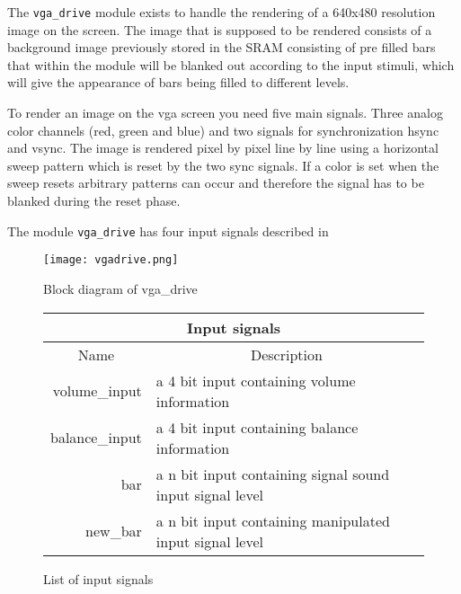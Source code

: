 The \verb+vga_drive+ module exists to handle the rendering of a 640x480 resolution image on the screen. 
The image that is supposed to be rendered consists of a background image previously 
stored in the SRAM consisting of pre filled bars that within the module will be blanked
out according to the input stimuli, which will give the appearance of bars being filled 
to different levels.   

To render an image on the vga screen you need five main signals. Three analog color channels (red, green and blue)
and two signals for synchronization hsync and vsync. The image is rendered pixel by pixel line by line using
a horizontal sweep pattern which is reset by the two sync signals. If a color is set when the sweep resets
arbitrary patterns can occur and therefore the signal has to be blanked during the reset phase.

The module \verb+vga_drive+ has four input signals described in 

\begin{figure}[h]
        \texttt{[image: vgadrive.png]}
        \caption{Block diagram of vga\_drive}
        \label{fig:vgadrive}
\end{figure}

\begin{figure}[h]
        \caption{List of input signals}
        \label{tab:input}
\begin{tabular}{|r|l|}
        \hline
        \multicolumn{2}{|c|}{Input signals}\\
        \hline
        \multicolumn{1}{|c}{Name} & \multicolumn{1}{c|}{Description} \\
        \hline
        volume\_input & a 4 bit input containing volume information\\
        \cline{1-2}
        \hline
        balance\_input & a 4 bit input containing balance information\\
        \cline{1-2}    
        \hline
        bar & a n bit input containing signal sound input signal level\\
        \cline{1-2}    
        \hline
        new\_bar & a n bit input containing manipulated input signal level\\
        \cline{1-2}    
        \hline
\end{tabular}
\end{figure}

